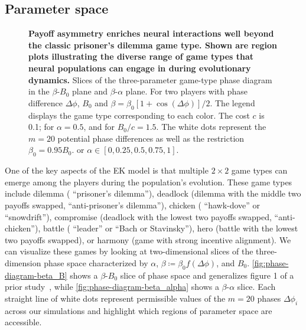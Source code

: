 \documentclass[pdflatex,lineno,referee,sn-nature]{sn-jnl}
\begin{document}
\subsection{Parameter space}
\begin{figure*}
  \centering
  \begin{subcaptiongroup}
      {\label{fig:phase-diagram-beta_alpha}\captiontext*{}}{%
      {\label{fig:phase-diagram-beta_B}\captiontext*{}}{%
    {}%
  }}
  \end{subcaptiongroup}
  \caption{
    \textbf{
      Payoff asymmetry enriches neural interactions
      well beyond the classic prisoner's dilemma game type.
      Shown are region plots illustrating the diverse range
      of game types that neural populations can engage in
      during evolutionary dynamics.
    }
    Slices of the three-parameter game-type phase diagram
    in the
    $\beta$-$B_0$ plane
    and
    $\beta$-$\alpha$ plane.
    For two players with phase difference $\Delta \phi$,
    $B_0$
    and
    $\beta = \beta_0 [1 + \cos(\Delta \phi)]/2$.
    The legend displays the game type corresponding to each color.
    The cost $c$ is \num{0.1};
    for
    $\alpha = 0.5$,
    and for
    $B_0/c = 1.5$.
    The white dots represent the $m=20$ potential phase differences
    as well as the restriction
    $\beta_0 = \num{0.95} B_0$.
    or
    $\alpha \in [0,0.25,0.5,0.75,1]$.
  }\label{fig:phase-diagram}
\end{figure*}

One of the key aspects of the EK model
is that multiple $2 \times 2$ game types can emerge
among the players during the population's evolution.
These game types~\citep{bruns2015names} include
dilemma (\aka{} ``prisoner's dilemma''),
deadlock (dilemma with the middle two payoffs swapped,
\aka{} ``anti-prisoner's dilemma''),
chicken (\aka{} ``hawk-dove'' or ``snowdrift''),
compromise (deadlock with the lowest two payoffs swapped,
\aka{} ``anti-chicken''),
battle (\aka{} ``leader'' or ``Bach or Stavinsky''),
hero (battle with the lowest two payoffs swapped),
or
harmony (game with strong incentive alignment).
We can visualize these games by looking at two-dimensional slices
of the three-dimension phase space
characterized by $\alpha$, $\beta \coloneqq \beta_0 f(\Delta \phi)$,
and $B_0$.
\cref{fig:phase-diagram-beta_B} shows a $\beta$-$B_0$ slice of phase space
and generalizes figure 1 of a prior study~\citep{tripp2022evolutionary},
while \cref{fig:phase-diagram-beta_alpha} shows a $\beta$-$\alpha$ slice.
Each straight line of white dots represent permissible values of the $m = 20$ phases
$\Delta \phi_i$ across our simulations
and highlight which regions of parameter space are accessible.
\end{document}
